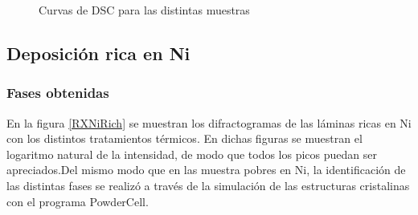 \documentclass[12pt]{article}
\theoremstyle{definition}
\theoremstyle{remark}
\begin{document}
{\begin{figure}[H]
{	}
\caption{Curvas de DSC para las distintas muestras}
\label{DSCNiPoor}
\end{figure}


\subsection{Deposición rica en Ni}
\subsubsection{Fases obtenidas}
En la figura \ref{RXNiRich} se muestran los difractogramas de las láminas ricas en Ni con los distintos tratamientos térmicos. En dichas figuras se muestran el logaritmo natural de la intensidad, de modo que todos los picos puedan ser apreciados.Del mismo modo que en las muestra pobres en Ni, la identificación de las distintas fases se realizó a través de la simulación de las estructuras cristalinas con el programa PowderCell.

}
\end{document}
